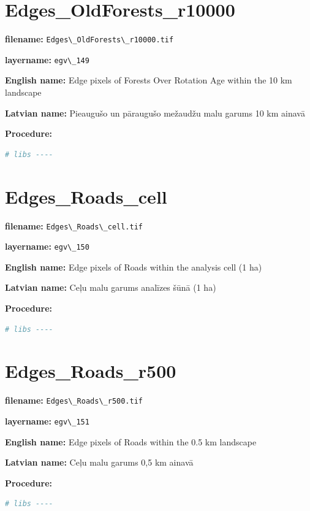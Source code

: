 \documentclass[
]{book}
\newcommand{\passthrough}[1]{#1}
\begin{document}
\section{Edges\_OldForests\_r10000}\label{ch06.149}

\textbf{filename:} \passthrough{\lstinline!Edges\_OldForests\_r10000.tif!}

\textbf{layername:} \passthrough{\lstinline!egv\_149!}

\textbf{English name:} Edge pixels of Forests Over Rotation Age within the 10 km landscape

\textbf{Latvian name:} Pieaugušo un pāraugušo mežaudžu malu garums 10 km ainavā

\textbf{Procedure:}

\begin{lstlisting}[language=R]
# libs ----
\end{lstlisting}

\section{Edges\_Roads\_cell}\label{ch06.150}

\textbf{filename:} \passthrough{\lstinline!Edges\_Roads\_cell.tif!}

\textbf{layername:} \passthrough{\lstinline!egv\_150!}

\textbf{English name:} Edge pixels of Roads within the analysis cell (1 ha)

\textbf{Latvian name:} Ceļu malu garums analīzes šūnā (1 ha)

\textbf{Procedure:}

\begin{lstlisting}[language=R]
# libs ----
\end{lstlisting}

\section{Edges\_Roads\_r500}\label{ch06.151}

\textbf{filename:} \passthrough{\lstinline!Edges\_Roads\_r500.tif!}

\textbf{layername:} \passthrough{\lstinline!egv\_151!}

\textbf{English name:} Edge pixels of Roads within the 0.5 km landscape

\textbf{Latvian name:} Ceļu malu garums 0,5 km ainavā

\textbf{Procedure:}

\begin{lstlisting}[language=R]
# libs ----
\end{lstlisting}
\end{document}

